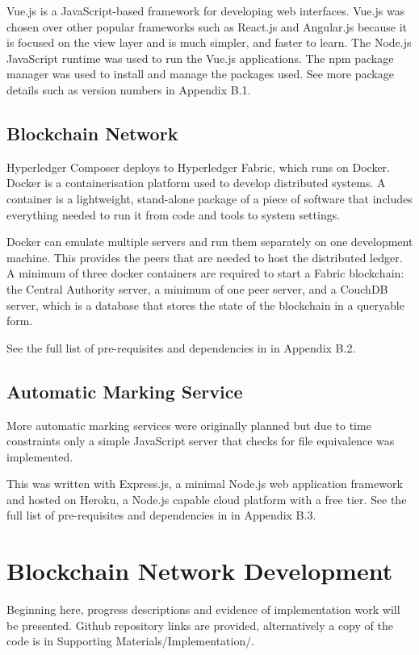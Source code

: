 Vue.js is a JavaScript-based framework for developing web interfaces. Vue.js was chosen over other
popular frameworks such as React.js and Angular.js because it is focused on the view layer and is much
simpler, and faster to learn. The Node.js JavaScript runtime was used to run the Vue.js applications. 
The npm package manager was used to install and manage the packages used. 
See more package details such as version numbers in Appendix B.1.

\subsection{Blockchain Network}

Hyperledger Composer deploys to Hyperledger Fabric, which runs on Docker.
Docker is a containerisation platform used to develop distributed systems.
A container is a lightweight, stand-alone package of a piece of software that includes everything
needed to run it from code and tools to system settings.

Docker can emulate multiple servers and run them separately on one development machine.
This provides the peers that are needed to host the distributed ledger. 
A minimum of three docker containers are required to start a
Fabric blockchain: the Central Authority server, a minimum of one peer server, and a CouchDB server,
which is a database that stores the state of the blockchain in a queryable form.

See the full list of pre-requisites and dependencies in in Appendix B.2.

\subsection{Automatic Marking Service}

More automatic marking services were originally planned but due to time constraints only
a simple JavaScript server that checks for file equivalence was implemented.

This was written with Express.js, a minimal Node.js web application framework and hosted
on Heroku, a Node.js capable cloud platform with a free tier. See the full list of pre-requisites and dependencies in in Appendix B.3.

\section{Blockchain Network Development}

Beginning here, progress descriptions and evidence of implementation work will be presented. 
Github repository links are provided, alternatively a copy of the code is in Supporting Materials/Implementation/.

